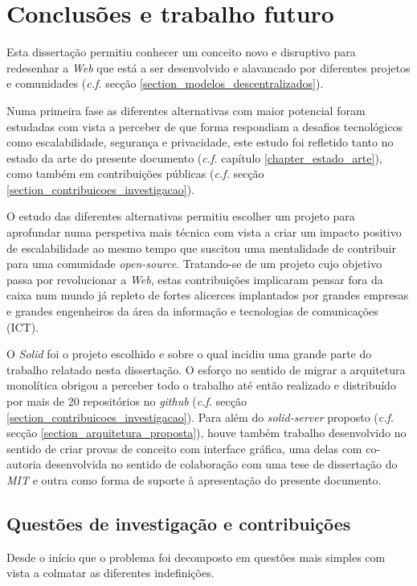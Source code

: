 
\chapter{Conclusões e trabalho futuro}
\label{cap:7}

Esta dissertação permitiu conhecer um conceito novo e disruptivo para redesenhar a \emph{Web} que está a ser desenvolvido e alavancado por diferentes projetos e comunidades (\emph{c.f.} secção \ref{section_modelos_descentralizados}).

Numa primeira fase as diferentes alternativas com maior potencial foram estudadas com vista a perceber de que forma respondiam a desafios tecnológicos como escalabilidade, segurança e privacidade, este estudo foi refletido tanto no estado da arte do presente documento (\emph{c.f.} capítulo \ref{chapter_estado_arte}), como também em contribuições públicas (\emph{c.f.} secção \ref{section_contribuicoes_investigacao}).

O estudo das diferentes alternativas permitiu escolher um projeto para aprofundar numa perspetiva mais técnica com vista a criar um impacto positivo de escalabilidade ao mesmo tempo que suscitou uma mentalidade de contribuir para uma comunidade \emph{open-source}. Tratando-se de um projeto cujo objetivo passa por revolucionar a \emph{Web}, estas contribuições implicaram pensar fora da caixa num mundo já repleto de fortes alicerces implantados por grandes empresas e grandes engenheiros da área da informação e tecnologias de comunicações (ICT).

O \emph{Solid} foi o projeto escolhido e sobre o qual incidiu uma grande parte do trabalho relatado nesta dissertação. O esforço no sentido de migrar a arquitetura monolítica obrigou a perceber todo o trabalho até então realizado e distribuído por mais de 20 repositórios no \emph{github} (\emph{c.f.} secção \ref{section_contribuicoes_investigacao}). Para além do \emph{solid-server} proposto (\emph{c.f.} secção \ref{section_arquitetura_proposta}), houve também trabalho desenvolvido no sentido de criar provas de conceito com interface gráfica, uma delas com co-autoria desenvolvida no sentido de colaboração com uma tese de dissertação do \emph{\acrshort{MIT}} e outra como forma de suporte à apresentação do presente documento.

\section{Questões de investigação e contribuições}
Desde o início que o problema foi decomposto em questões mais simples com vista a colmatar as diferentes indefinições.

